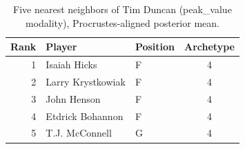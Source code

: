 \begin{table}[htbp]
  \centering\small
  \begin{tabular}{rllc}
    \toprule
    Rank & Player & Position & Archetype \\
    \midrule
    1 & Isaiah Hicks & F & 4 \\
    2 & Larry Krystkowiak & F & 4 \\
    3 & John Henson & F & 4 \\
    4 & Etdrick Bohannon & F & 4 \\
    5 & T.J. McConnell & G & 4 \\
    \bottomrule
  \end{tabular}
  \caption{Five nearest neighbors of Tim Duncan (peak_value modality), Procrustes-aligned posterior mean.}
  \label{tab:Tim_Duncan_neighbors_peak_value}
\end{table}


